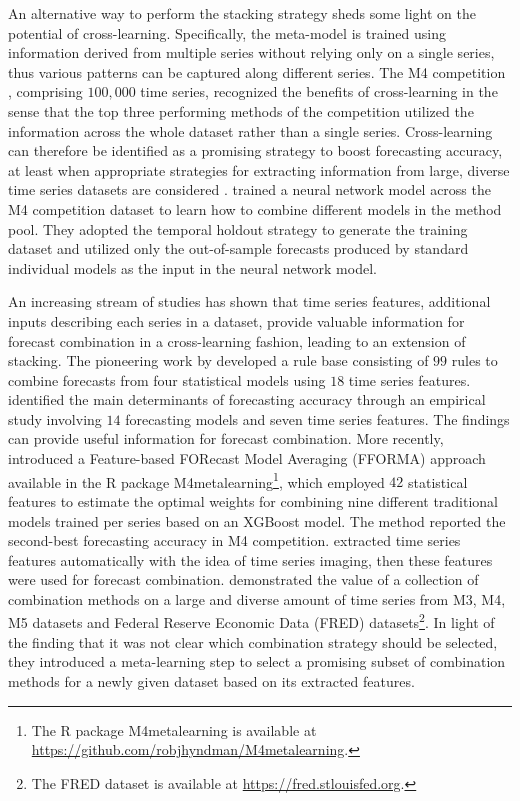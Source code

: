 \documentclass[11pt]{article}
\begin{document}
An alternative way to perform the stacking strategy sheds some light on the potential of cross-learning. Specifically, the meta-model is trained using information derived from multiple series without relying only on a single series, thus various patterns can be captured along different series. The M4 competition \citep{Makridakis2020-hu}, comprising $100,000$ time series, recognized the benefits of cross-learning in the sense that the top three performing methods of the competition utilized the information across the whole dataset rather than a single series. Cross-learning can therefore be identified as a promising strategy to boost forecasting accuracy, at least when appropriate strategies for extracting information from large, diverse time series datasets are considered \citep{Kang2020-sa,Semenoglou2020-xx}. \cite{Zhao2020-ep} trained a neural network model across the M4 competition dataset to learn how to combine different models in the method pool. They adopted the temporal holdout strategy to generate the training dataset and utilized only the out-of-sample forecasts produced by standard individual models as the input in the neural network model.

An increasing stream of studies has shown that time series features, additional inputs describing each series in a dataset, provide valuable information for forecast combination in a cross-learning fashion, leading to an extension of stacking. The pioneering work by \cite{Collopy1992-ey} developed a rule base consisting of $99$ rules to combine forecasts from four statistical models using $18$ time series features. \cite{Petropoulos2014-uy} identified the main determinants of forecasting accuracy through an empirical study involving $14$ forecasting models and seven time series features. The findings can provide useful information for forecast combination. More recently, \cite{Montero-Manso2020-tq} introduced a Feature-based FORecast Model Averaging (FFORMA) approach available in the R package M4metalearning\footnote{The R package M4metalearning is available at \url{https://github.com/robjhyndman/M4metalearning}.}, which employed $42$ statistical features \citep[implemented using the R package tsfeatures,][]{rtsfeatures} to estimate the optimal weights for combining nine different traditional models trained per series based on an XGBoost model. The method reported the second-best forecasting accuracy in M4 competition. \cite{Li2020-od} extracted time series features automatically with the idea of time series imaging, then these features were used for forecast combination. \cite{Gastinger2021-ey} demonstrated the value of a collection of combination methods on a large and diverse amount of time series from M3, M4, M5 datasets \citep{Makridakis2000-he, Makridakis2020-hu, Makridakis2020-fn} and Federal Reserve Economic Data (FRED) datasets\footnote{The FRED dataset is available at \url{https://fred.stlouisfed.org}.}. In light of the finding that it was not clear which combination strategy should be selected, they introduced a meta-learning step to select a promising subset of combination methods for a newly given dataset based on its extracted features.
\end{document}

